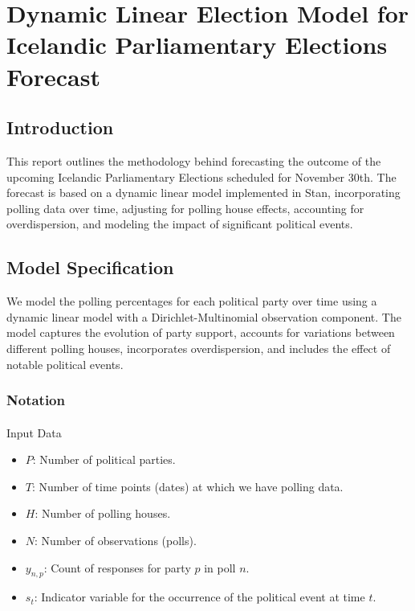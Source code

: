 \documentclass[
  letterpaper,
  DIV=11,
  numbers=noendperiod]{scrartcl}
\author{}
\date{}
\makeatletter
\let\oldparagraph\paragraph
\renewcommand{\paragraph}{
    \@ifstar
      \xxxParagraphStar
      \xxxParagraphNoStar
  }
\newcommand{\xxxParagraphStar}[1]{\oldparagraph*{#1}\mbox{}}
\newcommand{\xxxParagraphNoStar}[1]{\oldparagraph{#1}\mbox{}}
\providecommand{\tightlist}{%
  \setlength{\itemsep}{0pt}\setlength{\parskip}{0pt}}\usepackage{longtable,booktabs,array}
\makeatother
\begin{document}
\section{Dynamic Linear Election Model for Icelandic Parliamentary
Elections
Forecast}\label{dynamic-linear-election-model-for-icelandic-parliamentary-elections-forecast}

\subsection{Introduction}\label{introduction}

This report outlines the methodology behind forecasting the outcome of
the upcoming Icelandic Parliamentary Elections scheduled for November
30th. The forecast is based on a dynamic linear model implemented in
Stan, incorporating polling data over time, adjusting for polling house
effects, accounting for overdispersion, and modeling the impact of
significant political events.

\subsection{Model Specification}\label{model-specification}

We model the polling percentages for each political party over time
using a dynamic linear model with a Dirichlet-Multinomial observation
component. The model captures the evolution of party support, accounts
for variations between different polling houses, incorporates
overdispersion, and includes the effect of notable political events.

\subsubsection{Notation}\label{notation}

\paragraph{Input Data}\label{input-data}

\begin{itemize}
\tightlist
\item
  \(P\): Number of political parties.
\item
  \(T\): Number of time points (dates) at which we have polling data.
\item
  \(H\): Number of polling houses.
\item
  \(N\): Number of observations (polls).
\item
  \(y_{n,p}\): Count of responses for party \(p\) in poll \(n\).
\item
  \(s_t\): Indicator variable for the occurrence of the political event
  at time \(t\).
\end{itemize}
\end{document}
